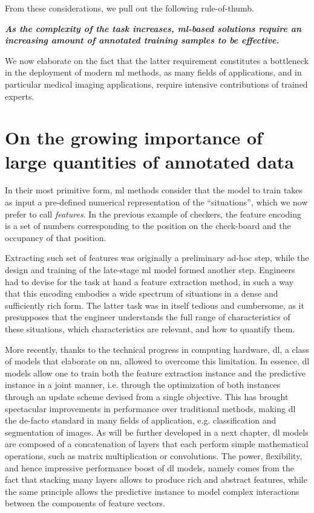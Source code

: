 From these considerations, we pull out the following rule-of-thumb.

\textbf{\textit{As the complexity of the task increases, \gls{ml}-based solutions require an increasing amount of annotated training samples to be effective.}}

We now elaborate on the fact that the latter requirement constitutes a bottleneck in the deployment of modern \gls{ml} methods, as many fields of applications, and in particular medical imaging applications, require intensive contributions of trained experts.

\section{On the growing importance of large quantities of annotated data}
In their most primitive form, \gls{ml} methods consider that the model to train takes as input a pre-defined numerical representation of the ``situations'', which we now prefer to call \textit{features}.
In the previous example of checkers, the feature encoding is a set of numbers corresponding to the position on the check-board and the occupancy of that position.

Extracting such set of features was originally a preliminary ad-hoc step, while the design and training of the late-stage \gls{ml} model formed another step.
Engineers had to devise for the task at hand a feature extraction method, in such a way that this encoding embodies a wide spectrum of situations in a dense and sufficiently rich form.
The latter task was in itself tedious and cumbersome, as it presupposes that the engineer understands the full range of characteristics of these situations, which characteristics are relevant, and how to quantify them.

More recently, thanks to the technical progress in computing hardware, \gls{dl}, a class of models that elaborate on \gls{nn}, allowed to overcome this limitation.
In essence, \gls{dl} models allow one to train both the feature extraction instance and the predictive instance in a joint manner, i.e. through the optimization of both instances through an update scheme devised from a single objective.
This has brought spectacular improvements in performance over traditional methods, making \gls{dl} the de-facto standard in many fields of application, e.g. classification and segmentation of images.
As will be further developed in a next chapter, \gls{dl} models are composed of a concatenation of layers that each perform simple mathematical operations, such as matrix multiplication or convolutions.
The power, flexibility, and hence impressive performance boost of \gls{dl} models, namely comes from the fact that stacking many layers allows to produce rich and abstract features, while the same principle allows the predictive instance to model complex interactions between the components of feature vectors.

